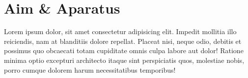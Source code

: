 \section{Aim \& Aparatus}
	Lorem ipsum dolor, sit amet consectetur adipisicing elit. Impedit mollitia illo reiciendis, nam at blanditiis dolore repellat. Placeat nisi, neque odio, debitis et possimus quo obcaecati totam cupiditate omnis culpa labore aut dolor! Ratione minima optio excepturi architecto itaque sint perspiciatis quos, molestiae nobis, porro cumque dolorem harum necessitatibus temporibus!
